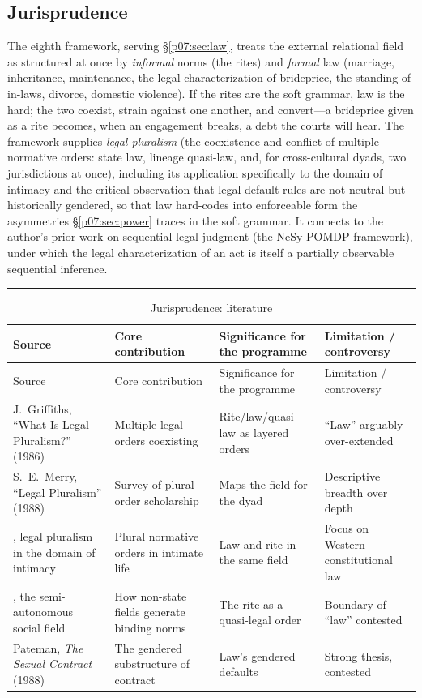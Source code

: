 \documentclass[11pt,a4paper]{article}
\newcommand{\goldrule}{\noindent\textcolor{gold}{\rule{\linewidth}{0.6pt}}\par\vspace{0.4em}}
\newcommand{\xref}[1]{\textcolor{rose}{\S\ref{#1}}}
\begin{document}
\subsection{Jurisprudence}
The eighth framework, serving \xref{p07:sec:law}, treats the external relational field as structured at once by \emph{informal} norms (the rites) and \emph{formal} law (marriage, inheritance, maintenance, the legal characterization of brideprice, the standing of in-laws, divorce, domestic violence). If the rites are the soft grammar, law is the hard; the two coexist, strain against one another, and convert---a brideprice given as a rite becomes, when an engagement breaks, a debt the courts will hear. The framework supplies \emph{legal pluralism} \parencite{griffiths1986,merry1988,moore1973semiautonomous} (the coexistence and conflict of multiple normative orders: state law, lineage quasi-law, and, for cross-cultural dyads, two jurisdictions at once), including its application specifically to the domain of intimacy \parencite{cohen2012intimacy} and the critical observation that legal default rules are not neutral but historically gendered, so that law hard-codes into enforceable form the asymmetries \xref{p07:sec:power} traces in the soft grammar. It connects to the author's prior work on sequential legal judgment (the NeSy-POMDP framework), under which the legal characterization of an act is itself a partially observable sequential inference.

\goldrule
\footnotesize
\begin{longtable}{Y Y Y Y}
\caption{Jurisprudence: literature}\label{p07:tab:lit-juris}\\
\toprule
{}
Source & Core contribution & Significance for the programme & Limitation / controversy \\
\midrule
\endfirsthead
{}
Source & Core contribution & Significance for the programme & Limitation / controversy \\
\midrule
\endhead
J.\ Griffiths, ``What Is Legal Pluralism?'' (1986) & Multiple legal orders coexisting & Rite/law/quasi-law as layered orders & ``Law'' arguably over-extended \\
S.\ E.\ Merry, ``Legal Pluralism'' (1988) & Survey of plural-order scholarship & Maps the field for the dyad & Descriptive breadth over depth \\
\textcite{cohen2012intimacy}, legal pluralism in the domain of intimacy & Plural normative orders in intimate life & Law and rite in the same field & Focus on Western constitutional law \\
\textcite{moore1973semiautonomous}, the semi-autonomous social field & How non-state fields generate binding norms & The rite as a quasi-legal order & Boundary of ``law'' contested \\
Pateman, \emph{The Sexual Contract} (1988) & The gendered substructure of contract & Law's gendered defaults & Strong thesis, contested \\
\bottomrule
\end{longtable}
\end{document}
